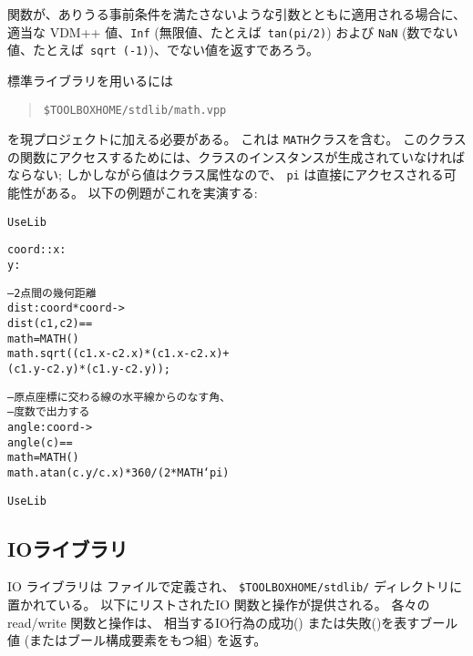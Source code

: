 \documentclass[\pformat,12pt]{jarticle}
\newcommand{\vdmslpp}[2]{%
#2
}
\newcommand{\vdmsl}{VDM-SL}
\newcommand{\vdmpp}{VDM++}
\begin{document}
関数が、ありうる事前条件を満たさないような引数とともに適用される場合に、適当な\vdmslpp{\vdmsl}{\vdmpp} 値、{\tt Inf} (無限値、たとえば\ {\tt  tan(pi/2)}) および {\tt NaN} (数でない値、たとえば\ {\tt sqrt (-1)})、でない値を返すであろう。


標準ライブラリを用いるには
\begin{quote}
\verb+$TOOLBOXHOME/stdlib/math.vpp+
\end{quote}
を現プロジェクトに加える必要がある。
これは \texttt{MATH}クラスを含む。
このクラスの関数にアクセスするためには、クラスのインスタンスが生成されていなければならない; 
しかしながら値はクラス属性なので、 \texttt{pi} は直接にアクセスされる可能性がある。
以下の例題がこれを実演する:
\begin{alltt}
 UseLib



  coord :: x : 
           y : 


  -- 2点間の幾何距離
  dist : coord * coord -> 
  dist (c1,c2) ==
     math =  MATH()
    math.sqrt((c1.x - c2.x) * (c1.x - c2.x) +
              (c1.y - c2.y) * (c1.y - c2.y));


  -- 原点座標に交わる線の水平線からのなす角、
 -- 度数で出力する
  angle : coord -> 
  angle (c) ==
     math =  MATH()
    math.atan (c.y / c.x) * 360 / ( 2 * MATH`pi)

 UseLib
\end{alltt}

\subsection{IOライブラリ}

 IO ライブラリは ファイルで定義され、 \verb+$TOOLBOXHOME/stdlib/+ ディレクトリに置かれている。
以下にリストされたIO 関数と操作が提供される。
各々の read/write 関数と操作は、 相当するIO行為の成功() または失敗()を表すブール値 (またはブール構成要素をもつ組) を返す。
\end{document}
